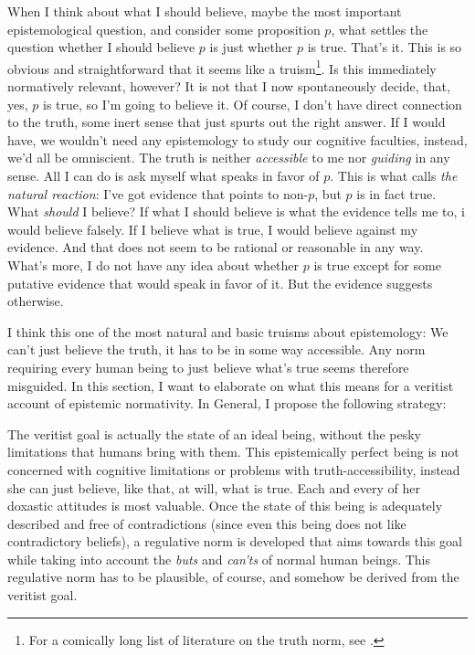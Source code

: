 \documentclass[12pt,numbers=noenddot]{scrartcl}
\begin{document}
When I think about what I should believe, maybe the most important epistemological question, and consider some proposition $p$, what settles the question whether I should believe $p$ is just whether $p$ is true. That's it. This is so obvious and straightforward that it seems like a truism\footnote{For a comically long list of literature on the truth norm, see \textcite[25]{Mchugh2012-MCHTTN}.}. Is this immediately normatively relevant, however? It is not that I now spontaneously decide, that, yes, $p$ is true, so I'm going to believe it. Of course, I don't have direct connection to the truth, some inert sense that just spurts out the right answer. If I would have, we wouldn't need any epistemology to study our cognitive faculties, instead, we'd all be omniscient. The truth is neither \emph{accessible} to me nor \emph{guiding} in any sense. All I can do is ask myself what speaks in favor of $p$. This is what \textcite{Gibbons2013-GIBTNO} calls \emph{the natural reaction}: I've got evidence that points to non-$p$, but $p$ is in fact true. What \emph{should} I believe? If what I should believe is what the evidence tells me to, i would believe falsely. If I believe what is true, I would believe against my evidence. And that does not seem to be rational or reasonable in any way. What's more, I do not have any idea about whether $p$ is true except for some putative evidence that would speak in favor of it. But the evidence suggests otherwise.

I think this one of the most natural and basic truisms about epistemology: We can't just believe the truth, it has to be in some way accessible. Any norm requiring every human being to just believe what's true seems therefore misguided. In this section, I want to elaborate on what this means for a veritist account of epistemic normativity. In General, I propose the following strategy:

The veritist goal is actually the state of an ideal being, without the pesky limitations that humans bring with them. This epistemically perfect being is not concerned with cognitive limitations or problems with truth-accessibility, instead she can just believe, like that, at will, what is true. Each and every of her doxastic attitudes is most valuable. Once the state of this being is adequately described and free of contradictions (since even this being does not like contradictory beliefs), a regulative norm is developed that aims towards this goal while taking into account the \emph{buts} and \emph{can'ts} of normal human beings. This regulative norm has to be plausible, of course, and somehow be derived from the veritist goal.
\end{document}
